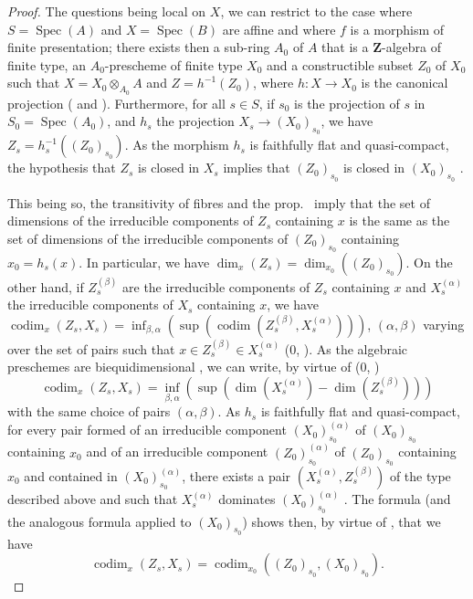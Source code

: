 \begin{proof}
\label{IV.9.9.1-proof}
The questions being local on $X$, we can restrict to the case where $S=\operatorname{Spec}(A)$ and $X=\operatorname{Spec}(B)$ are affine and where $f$ is a morphism of finite presentation; there exists then a sub-ring $A_0$ of $A$ that is a $\mathbf{Z}$-algebra of finite type, an $A_0$-prescheme of finite type $X_0$ and a constructible subset $Z_0$ of $X_0$ such that $X=X_0\otimes_{A_0}A$ and $Z=h^{-1}(Z_0)$, where $h:X\to X_0$ is the canonical projection ( and ).
Furthermore, for all $s\in S$, if $s_0$ is the projection of $s$ in $S_0=\operatorname{Spec}(A_0)$, and $h_s$ the projection $X_s\to(X_0)_{s_0}$, we have $Z_s=h_s^{-1}((Z_0)_{s_0})$.
As the morphism $h_s$ is faithfully flat and quasi-compact, the hypothesis that $Z_s$ is closed in $X_s$ implies that $(Z_0)_{s_0}$ is closed in $(X_0)_{s_0}$ .

This being so, the transitivity of fibres  and the prop.~ imply that the set of dimensions of the irreducible components of $Z_s$ containing $x$ is the same as the set of dimensions of the irreducible components of $(Z_0)_{s_0}$ containing $x_0=h_s(x)$.
In particular, we have $\dim_x(Z_s)=\dim_{x_0}((Z_0)_{s_0})$.
On the other hand, if $Z_s^{(\beta)}$ are the irreducible components of $Z_s$ containing $x$ and $X_s^{(\alpha)}$ the irreducible components of $X_s$
containing $x$, we have $\operatorname{codim}_x(Z_s,X_s)=\inf_{\beta,\alpha}(\sup(\operatorname{codim}(Z_s^{(\beta)},X_s^{(\alpha)})))$, $(\alpha,\beta)$ varying over the set of pairs such that $x\in Z_s^{(\beta)}\in X_s^{(\alpha)}$ ($0$, ).
As the algebraic preschemes are biequidimensional , we can write, by virtue of ($0$, )
\begin{equation}
\tag{9.9.1.1}
\label{IV.9.9.1.1}
  \operatorname{codim}_x(Z_s,X_s)=\inf_{\beta,\alpha}(\sup(\dim(X_s^{(\alpha)})-\dim(Z_s^{(\beta)})))
\end{equation}
with the same choice of pairs $(\alpha,\beta)$.
As $h_s$ is faithfully flat and quasi-compact, for every pair formed of an irreducible component $(X_0)_{s_0}^{(\alpha)}$ of $(X_0)_{s_0}$ containing $x_0$ and of an irreducible component $(Z_0)_{s_0}^{(\alpha)}$ of $(Z_0)_{s_0}$ containing $x_0$ and contained in $(X_0)_{s_0}^{(\alpha)}$, there exists a pair $(X_s^{(\alpha)},Z_s^{(\beta)})$ of the type described above and such that $X_s^{(\alpha)}$ dominates $(X_0)_{s_0}^{(\alpha)}$ .
The formula  (and the analogous formula applied to $(X_0)_{s_0}$) shows then, by virtue of , that we have
\[
  \operatorname{codim}_x(Z_s,X_s)=\operatorname{codim}_{x_0}((Z_0)_{s_0},(X_0)_{s_0}).
\]


\end{proof}
